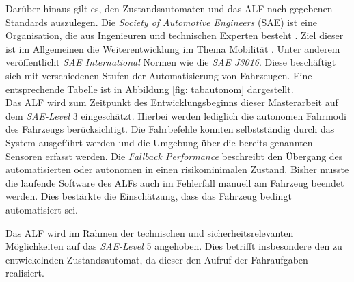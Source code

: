 	
	
	
	 
	
	Darüber hinaus gilt es, den Zustandsautomaten und das ALF nach gegebenen Standards auszulegen. Die \textit{Society of Automotive Engineers} (SAE) ist eine Organisation, die aus Ingenieuren und technischen Experten besteht \cite{saeorg}. Ziel dieser ist im Allgemeinen die Weiterentwicklung im Thema Mobilität \cite{saeorg}. Unter anderem veröffentlicht \textit{SAE International} Normen wie die \textit{SAE J3016}. Diese beschäftigt sich mit verschiedenen Stufen der Automatisierung von Fahrzeugen. Eine entsprechende Tabelle ist in Abbildung \ref{fig: tabautonom} dargestellt.\\
	
	Das ALF wird zum Zeitpunkt des Entwicklungsbeginns dieser Masterarbeit auf dem \textit{SAE-Level} 3 eingeschätzt. Hierbei werden lediglich die autonomen Fahrmodi des Fahrzeugs berücksichtigt. Die Fahrbefehle konnten selbstständig durch das System ausgeführt werden und die Umgebung über die bereits genannten Sensoren erfasst werden. Die \textit{Fallback Performance} beschreibt den Übergang des automatisierten oder autonomen in einen risikominimalen Zustand. Bisher musste die laufende Software des ALFs auch im Fehlerfall manuell am Fahrzeug beendet werden. Dies bestärkte die Einschätzung, dass das Fahrzeug bedingt automatisiert sei.	
	
	
	
	Das ALF wird im Rahmen der technischen und sicherheitsrelevanten Möglichkeiten auf das \textit{SAE-Level} 5 angehoben. Dies betrifft insbesondere den zu entwickelnden Zustandsautomat, da dieser den Aufruf der Fahraufgaben realisiert.\\
	  
	


		
	
		
		
				   		

